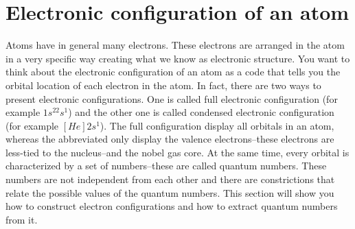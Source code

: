 \documentclass[main.tex]{subfiles}
\begin{document}
\section{Electronic configuration of an atom}
Atoms have in general many electrons. These electrons are arranged in the atom in a very specific way creating what we know as electronic structure. You want to think about the electronic configuration of an atom as a code that tells you the orbital location of each electron in the atom. In fact, there are two ways to present electronic configurations. One is called full electronic configuration (for example $1s^22s^1$) and the other one is called condensed electronic configuration (for example $[He]2s^1$). The full configuration display all orbitals in an atom, whereas the abbreviated only display the valence electrons--these electrons are less-tied to the nucleus--and the nobel gas core. At the same time, every orbital is characterized by a set of numbers--these are called quantum numbers. These numbers are not independent from each other and there are constrictions that relate the possible values of the quantum numbers. This section will show you how to construct electron configurations and how to extract quantum numbers from it.
\sloppy
\end{document}
